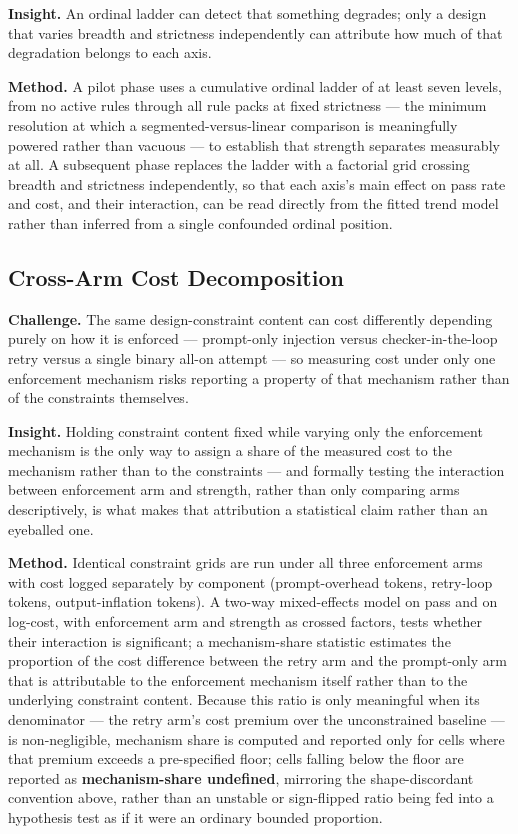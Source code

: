 \documentclass[11pt]{article}
\begin{document}
\textbf{Insight.} An ordinal ladder can detect that something degrades; only a design that varies breadth and strictness independently can attribute how much of that degradation belongs to each axis.

\textbf{Method.} A pilot phase uses a cumulative ordinal ladder of at least seven levels, from no active rules through all rule packs at fixed strictness --- the minimum resolution at which a segmented-versus-linear comparison is meaningfully powered rather than vacuous --- to establish that strength separates measurably at all. A subsequent phase replaces the ladder with a factorial grid crossing breadth and strictness independently, so that each axis's main effect on pass rate and cost, and their interaction, can be read directly from the fitted trend model rather than inferred from a single confounded ordinal position.

\subsection{Cross-Arm Cost Decomposition}
\textbf{Challenge.} The same design-constraint content can cost differently depending purely on how it is enforced --- prompt-only injection versus checker-in-the-loop retry versus a single binary all-on attempt --- so measuring cost under only one enforcement mechanism risks reporting a property of that mechanism rather than of the constraints themselves.

\textbf{Insight.} Holding constraint content fixed while varying only the enforcement mechanism is the only way to assign a share of the measured cost to the mechanism rather than to the constraints --- and formally testing the interaction between enforcement arm and strength, rather than only comparing arms descriptively, is what makes that attribution a statistical claim rather than an eyeballed one.

\textbf{Method.} Identical constraint grids are run under all three enforcement arms with cost logged separately by component (prompt-overhead tokens, retry-loop tokens, output-inflation tokens). A two-way mixed-effects model on pass and on log-cost, with enforcement arm and strength as crossed factors, tests whether their interaction is significant; a mechanism-share statistic estimates the proportion of the cost difference between the retry arm and the prompt-only arm that is attributable to the enforcement mechanism itself rather than to the underlying constraint content. Because this ratio is only meaningful when its denominator --- the retry arm's cost premium over the unconstrained baseline --- is non-negligible, mechanism share is computed and reported only for cells where that premium exceeds a pre-specified floor; cells falling below the floor are reported as \textbf{mechanism-share undefined}, mirroring the shape-discordant convention above, rather than an unstable or sign-flipped ratio being fed into a hypothesis test as if it were an ordinary bounded proportion.
\end{document}
